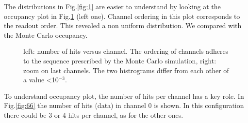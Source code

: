 The distributions in Fig.\ref{fig:1} are easier to understand by looking at the occupancy plot in Fig.\ref{fig:2} (left one). Channel ordering in this plot corresponds to the readout order.
This revealed a non uniform distribution. We compared with the Monte Carlo occupancy.
\begin{figure}[H]
  \hspace{-0.5in}
  \caption{
    \label{fig:2}
    left: number of hits versus channel. The ordering of channels adheres to the sequence prescribed by the Monte Carlo simulation, right: zoom on last channels. The two histrograms differ from each other of a value <10$^{-3}$.
  }
\end{figure}
To understand occupancy plot, the number of hits per channel has a key role. In Fig.\ref{fig:66} the number of hits (data) in channel 0 is shown. In this configuration there could be 3 or 4 hits per channel, as for the other ones.
